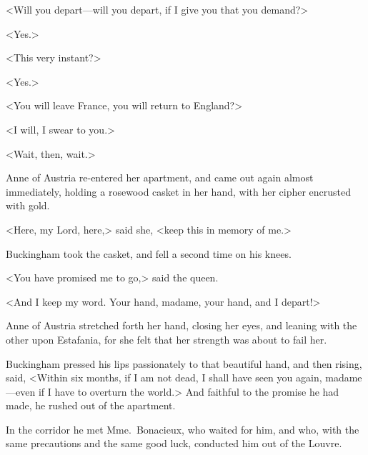 <Will you depart—will you depart, if I give you that you demand?> 

<Yes.> 

<This very instant?> 

<Yes.> 

<You will leave France, you will return to England?> 

<I will, I swear to you.> 

<Wait, then, wait.> 

Anne of Austria re-entered her apartment, and came out again almost immediately, holding a rosewood casket in her hand, with her cipher encrusted with gold. 

<Here, my Lord, here,> said she, <keep this in memory of me.> 

Buckingham took the casket, and fell a second time on his knees. 

<You have promised me to go,> said the queen. 

<And I keep my word. Your hand, madame, your hand, and I depart!> 

Anne of Austria stretched forth her hand, closing her eyes, and leaning with the other upon Estafania, for she felt that her strength was about to fail her. 

Buckingham pressed his lips passionately to that beautiful hand, and then rising, said, <Within six months, if I am not dead, I shall have seen you again, madame—even if I have to overturn the world.> And faithful to the promise he had made, he rushed out of the apartment. 

In the corridor he met Mme.~Bonacieux, who waited for him, and who, with the same precautions and the same good luck, conducted him out of the Louvre.